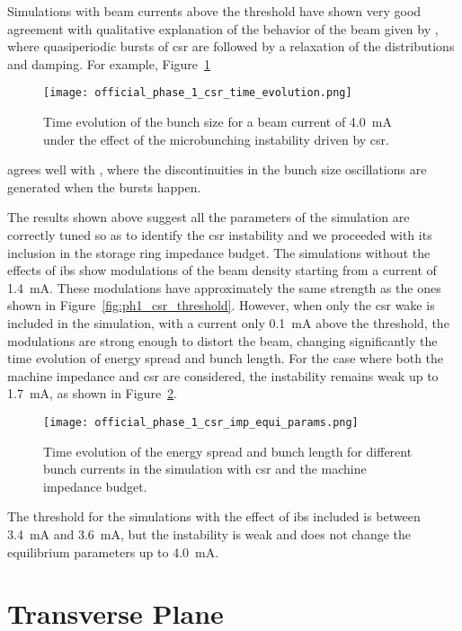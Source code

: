    Simulations with beam currents above the threshold have shown very good agreement with qualitative explanation of the behavior of the beam given by , where quasiperiodic bursts of \gls{csr} are followed by a relaxation of the distributions and damping. For example, Figure~\ref{fig:ph1_csr_time_evolution}
    \begin{figure}
        \centering
        \texttt{[image: official\_phase\_1\_csr\_time\_evolution.png]}
        \caption{Time evolution of the bunch size for a beam current of \SI{4.0}{\milli\ampere} under the effect of the microbunching instability driven by \gls{csr}.}
        \label{fig:ph1_csr_time_evolution}
    \end{figure}
    agrees well with \cite[Fig. 2]{Venturini2002}, where the discontinuities in the bunch size oscillations are generated when the bursts happen.

    The results shown above suggest all the parameters of the simulation are correctly tuned so as to identify the \gls{csr} instability and we proceeded with its inclusion in the storage ring impedance budget. The simulations without the effects of \gls{ibs} show modulations of the beam density starting from a current of \SI{1.4}{\milli\ampere}. These modulations have approximately the same strength as the ones shown in Figure~\ref{fig:ph1_csr_threshold}. However, when only the \gls{csr} wake is included in the simulation, with a current only \SI{0.1}{\milli\ampere} above the threshold, the modulations are strong enough to distort the beam, changing significantly the time evolution of energy spread and bunch length. For the case where both the machine impedance and \gls{csr} are considered, the instability remains weak up to \SI{1.7}{\milli\ampere}, as shown in Figure~\ref{fig:ph1_csr_imp_equi_params}.
    \begin{figure}
        \centering
        \texttt{[image: official\_phase\_1\_csr\_imp\_equi\_params.png]}
        \caption{Time evolution of the energy spread and bunch length for different bunch currents in the simulation with \gls{csr} and the machine impedance budget.}
        \label{fig:ph1_csr_imp_equi_params}
    \end{figure}
    The threshold for the simulations with the effect of \gls{ibs} included is between \SI{3.4}{\milli\ampere} and \SI{3.6}{\milli\ampere}, but the instability is weak and does not change the equilibrium parameters up to \SI{4.0}{\milli\ampere}.

\section{Transverse Plane}

